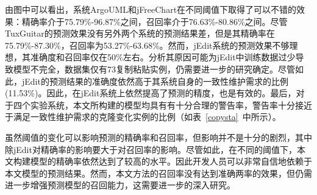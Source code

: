 由图中可以看出，系统ArgoUML和jFreeChart在不同阈值下取得了可以不错的效果：精确率介于75.79\%-96.87\%之间，召回率介于76.63\%-80.86\%之间。尽管TuxGuitar的预测效果没有另外两个系统的预测结果差，但是其精确率在75.79\%-87.30\%，召回率为53.27\%-63.68\%。然而，jEdit系统的预测效果不够理想，其准确度和召回率仅在50\%左右。分析其原因可能为jEdit中训练数据过少导致模型不完全，数据集仅有73复制粘贴实例，仍需要进一步的研究确定。尽管如此，jEdit的预测结果的准确度依然高于其系统自身的一致性维护需求的比例(11.53\%)。因此，在jEdit系统上依然提高了预测的精度，也是有效的。最后，对于四个实验系统，本文所构建的模型均具有有十分合理的警告率，警告率十分接近于满足一致性维护需求的克隆变化实例的比例（如表~\ref {copysta}~中所示）。

虽然阈值的变化可以影响预测的精确率和召回率，但影响并不是十分的剧烈，其中除jEdit对精确率的影响要大于对召回率的影响。尽管如此，在不同的阈值下，本文构建模型的精确率依然达到了较高的水平。因此开发人员可以非常自信地依赖于本文模型的预测结果。然而，本文方法的召回率没有达到准确两率的效果，但仍需进一步增强预测模型的召回能力，这需要进一步的深入研究。


